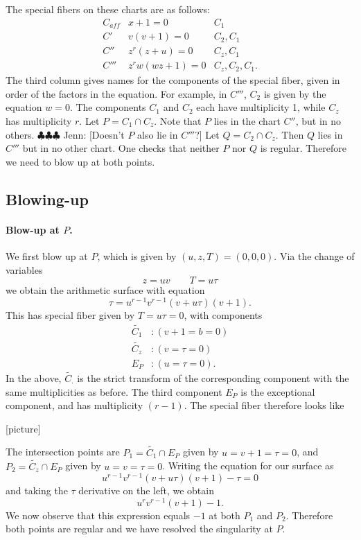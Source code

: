 \documentclass{article}
\newcommand{\jenn}[1]{{\color{magenta} \sf $\clubsuit\clubsuit\clubsuit$ Jenn: [#1]}}
\theoremstyle{plain}
\theoremstyle{definition}
\theoremstyle{remark}
\renewcommand{\tilde}[1]{\widetilde{#1}}
\begin{document}
The special fibers on these charts are as follows:
\[
\begin{array}{lll}
C_{aff} & x + 1 = 0 & C_1 \\
C' & v(v + 1) = 0 & C_2, C_1 \\
C'' & z^r(z + u) = 0 & C_z, C_1 \\
C''' & z^rw(wz+1) = 0 & C_z, C_2, C_1.
\end{array}
\]
The third column gives names for the components of the special fiber, given in order of the factors in the equation. For example, in $C'''$, $C_2$ is given by the equation $w = 0$. The components $C_1$ and $C_2$ each have multiplicity 1, while $C_z$ has multiplicity $r$. Let $P = C_1 \cap C_z$. Note that $P$ lies in the chart $C''$, but in no others. \jenn{Doesn't $P$ also lie in $C'''$?} Let $Q = C_2 \cap C_z$. Then $Q$ lies in $C'''$ but in no other chart. One checks that neither $P$ nor $Q$ is regular. Therefore we need to blow up at both points.

\subsection{Blowing-up}
\label{sec:blowing-up}

\paragraph{Blow-up at $P$.}
\label{sec:blow-up-P}

We first blow up at $P$, which is given by $(u,z,T) = (0,0,0)$. Via the change of variables
\[
z = uv \qquad T = u\tau
\]
we obtain the arithmetic surface with equation
\[
\tau = u^{r-1}v^{r-1}(v + u\tau)(v + 1).
\]
This has special fiber given by $T = u\tau = 0$, with components
\begin{align*}
  \tilde{C_1}&: (v + 1 = b = 0) \\
  \tilde{C_z}&: (v = \tau = 0) \\
  E_P&: (u = \tau = 0).
\end{align*}
In the above, $\tilde{C_\cdot}$ is the strict transform of the corresponding component with the same multiplicities as before. The third component $E_P$ is the exceptional component, and has multiplicity $(r-1)$. The special fiber therefore looks like

[picture]

The intersection points are $P_1 = \tilde{C_1} \cap E_P$ given by $u=v+1=\tau=0$, and $P_2 = \tilde{C_z} \cap E_P$ given by $u=v=\tau=0$. Writing the equation for our surface as
\[
u^{r-1}v^{r-1}(v + u\tau)(v + 1) - \tau = 0
\]
and taking the $\tau$ derivative on the left, we obtain
\[
u^rv^{r-1}(v + 1) - 1.
\]
We now observe that this expression equals $-1$ at both $P_1$ and $P_2$. Therefore both points are regular and we have resolved the singularity at $P$.
\end{document}
